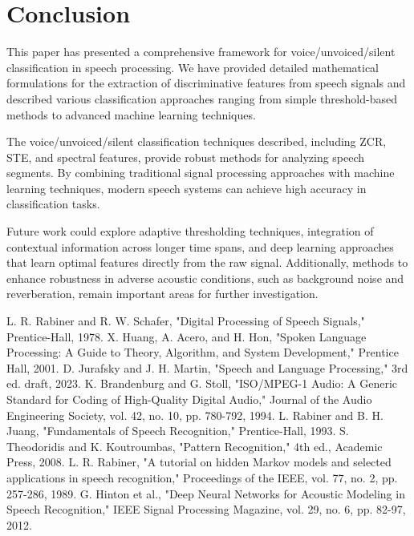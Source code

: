 \documentclass[10pt,journal,compsoc]{IEEEtran}
\begin{document}
\section{Conclusion}
This paper has presented a comprehensive framework for voice/unvoiced/silent classification in speech processing. We have provided detailed mathematical formulations for the extraction of discriminative features from speech signals and described various classification approaches ranging from simple threshold-based methods to advanced machine learning techniques.

The voice/unvoiced/silent classification techniques described, including ZCR, STE, and spectral features, provide robust methods for analyzing speech segments. By combining traditional signal processing approaches with machine learning techniques, modern speech systems can achieve high accuracy in classification tasks.

Future work could explore adaptive thresholding techniques, integration of contextual information across longer time spans, and deep learning approaches that learn optimal features directly from the raw signal. Additionally, methods to enhance robustness in adverse acoustic conditions, such as background noise and reverberation, remain important areas for further investigation.

\begin{thebibliography}{00}
 L. R. Rabiner and R. W. Schafer, "Digital Processing of Speech Signals," Prentice-Hall, 1978.
 X. Huang, A. Acero, and H. Hon, "Spoken Language Processing: A Guide to Theory, Algorithm, and System Development," Prentice Hall, 2001.
 D. Jurafsky and J. H. Martin, "Speech and Language Processing," 3rd ed. draft, 2023.
 K. Brandenburg and G. Stoll, "ISO/MPEG-1 Audio: A Generic Standard for Coding of High-Quality Digital Audio," Journal of the Audio Engineering Society, vol. 42, no. 10, pp. 780-792, 1994.
 L. Rabiner and B. H. Juang, "Fundamentals of Speech Recognition," Prentice-Hall, 1993.
 S. Theodoridis and K. Koutroumbas, "Pattern Recognition," 4th ed., Academic Press, 2008.
 L. R. Rabiner, "A tutorial on hidden Markov models and selected applications in speech recognition," Proceedings of the IEEE, vol. 77, no. 2, pp. 257-286, 1989.
 G. Hinton et al., "Deep Neural Networks for Acoustic Modeling in Speech Recognition," IEEE Signal Processing Magazine, vol. 29, no. 6, pp. 82-97, 2012.
\end{thebibliography}
\end{document}
